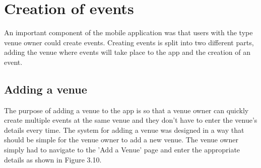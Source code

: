 \section{Creation of events}
An important component of the mobile application was that users with the type venue owner could create events. Creating events is split into two different parts, adding the venue where events will take place to the app and the creation of an event.

\subsection{Adding a venue}
The purpose of adding a venue to the app is so that a venue owner can quickly create multiple events at the same venue and they don't have to enter the venue's details every time. The system for adding a venue was designed in a way that should be simple for the venue owner to add a new venue. The venue owner simply had to navigate to the 'Add a Venue' page and enter the appropriate details as shown in Figure 3.10. 

